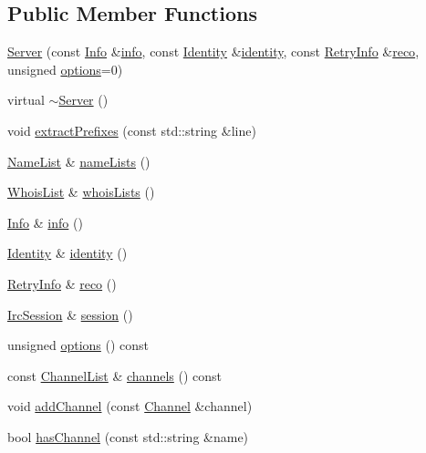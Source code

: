\subsection*{Public Member Functions}
\begin{DoxyCompactItemize}
\item 
\hyperlink{a00055_abe1b8204e9bebb1cbcc4bd6dfe372039}{Server} (const \hyperlink{a00031}{Info} \&\hyperlink{a00055_aea4180762745265bef4c2e42cb4e1002}{info}, const \hyperlink{a00029}{Identity} \&\hyperlink{a00055_a98da01d2140cc50b1b1e35ce7199a671}{identity}, const \hyperlink{a00053}{Retry\-Info} \&\hyperlink{a00055_a3d68352d6a7fe013fc6724c32dbb24fe}{reco}, unsigned \hyperlink{a00055_afdfc8ae96b7409c9a5f7ab8c7b43321c}{options}=0)
\item 
virtual \hyperlink{a00055_a9edb9cd52031a7fa2f05394a7a01e449}{$\sim$\-Server} ()
\item 
void \hyperlink{a00055_a40ed41b3938f400eacf99116aef583c6}{extract\-Prefixes} (const std\-::string \&line)
\item 
\hyperlink{a00055_ada7323736e755db49c77793a3aa768a3}{Name\-List} \& \hyperlink{a00055_a23c3cd7318dd4a7b125539e081d62e87}{name\-Lists} ()
\item 
\hyperlink{a00055_afddae57f2e12d80ef49128c82c5aca97}{Whois\-List} \& \hyperlink{a00055_ab15f99bd20dbdb244452caa7b0e78728}{whois\-Lists} ()
\item 
\hyperlink{a00031}{Info} \& \hyperlink{a00055_aea4180762745265bef4c2e42cb4e1002}{info} ()
\item 
\hyperlink{a00029}{Identity} \& \hyperlink{a00055_a98da01d2140cc50b1b1e35ce7199a671}{identity} ()
\item 
\hyperlink{a00053}{Retry\-Info} \& \hyperlink{a00055_a3d68352d6a7fe013fc6724c32dbb24fe}{reco} ()
\item 
\hyperlink{a00035}{Irc\-Session} \& \hyperlink{a00055_a08ce98f2608a3ad086d1be21d85b68ed}{session} ()
\item 
unsigned \hyperlink{a00055_afdfc8ae96b7409c9a5f7ab8c7b43321c}{options} () const 
\item 
const \hyperlink{a00055_aa6c9af0cbeeb89dc0b4ea278ffacaecf}{Channel\-List} \& \hyperlink{a00055_a1bace74c6731ce1ebb148b6637cfa3e4}{channels} () const 
\item 
void \hyperlink{a00055_a2be191ad3ade87278a8faff8ebbf9b09}{add\-Channel} (const \hyperlink{a00004}{Channel} \&channel)
\item 
bool \hyperlink{a00055_a101c1253a60e12997d82b6cd1f2404b3}{has\-Channel} (const std\-::string \&name)

\end{DoxyCompactItemize}
